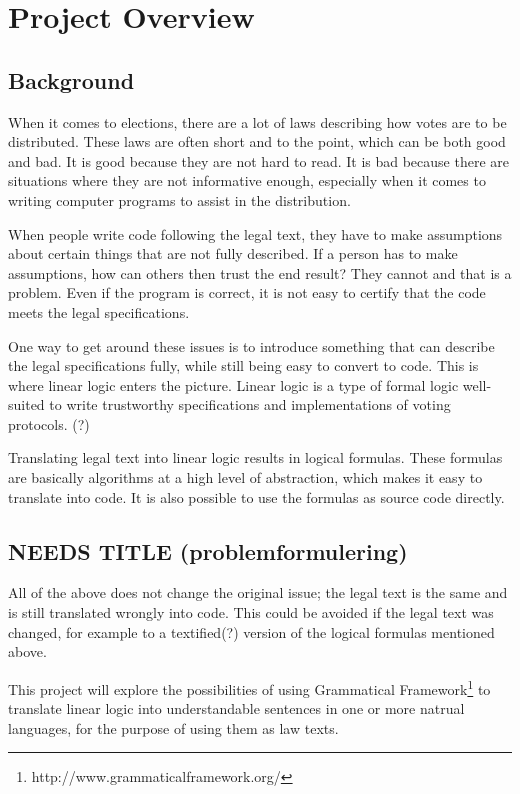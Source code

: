\chapter{Project Overview}
\label{02}

\section{Background}
\label{02_01}
When it comes to elections, there are a lot of laws describing how votes are to be distributed. These laws are often short and to the point, which can be both good and bad. It is good because they are not hard to read. It is bad because there are situations where they are not informative enough, especially when it comes to writing computer programs to assist in the distribution.

When people write code following the legal text, they have to make assumptions about certain things that are not fully described. If a person has to make assumptions, how can others then trust the end result? They cannot and that is a problem. Even if the program is correct, it is not easy to certify that the code meets the legal specifications.

One way to get around these issues is to introduce something that can describe the legal specifications fully, while still being easy to convert to code. This is where linear logic enters the picture. Linear logic is a type of formal logic well-suited to write trustworthy specifications and implementations of voting protocols. (?)

Translating legal text into linear logic results in logical formulas. These formulas are basically algorithms at a high level of abstraction, which makes it easy to translate into code. It is also possible to use the formulas as source code directly.

\section{NEEDS TITLE (problemformulering)}
\label{02_02}

All of the above does not change the original issue; the legal text is the same and is still translated wrongly into code. This could be avoided if the legal text was changed, for example to a textified(?) version of the logical formulas mentioned above.

This project will explore the possibilities of using Grammatical Framework\footnote{http://www.grammaticalframework.org/} to translate linear logic into understandable sentences in one or more natrual languages, for the purpose of using them as law texts.